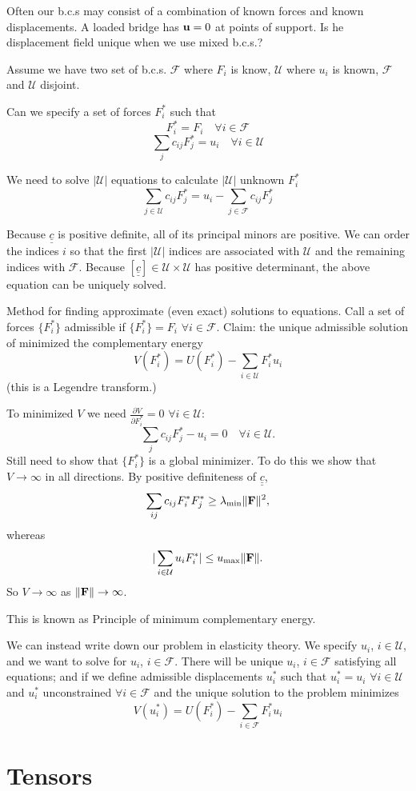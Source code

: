 \documentclass[12pt]{article}
\newcommand{\uu}{{\bf u}}
\newcommand{\FF}{{\bf F}}
\newcommand{\cc}{{\underline{\underline c}}}
\newcommand{\UU}{{\mathcal U}}
\newcommand{\cF}{{\mathcal F}}
\begin{document}
\bigskip
\bigskip
Often our b.c.s may consist of a combination of known forces and known displacements. A loaded bridge has $\uu=0$ at points of support. Is he displacement field unique when we use mixed b.c.s.?

Assume we have two set of b.c.s. $\cF$ where $F_i$ is know, $\UU$ where $u_i$ is known, $\cF$ and $\UU$ disjoint.

Can we specify a set of forces $F_i^*$ such that 
\[
F_i^*  = F_i \quad  \forall i\in \cF
\]
\[
\sum_jc_{ij}F_j^*  = u_i \quad \forall i\in \UU
\]

We need to solve $|\UU|$ equations to calculate $|\UU|$ unknown $F_i^*$
\[
\sum_{j\in \UU} c_{ij}F_j^* = u_i - \sum_{j\in\cF} c_{ij}F_j^*
\]

Because $\cc$ is positive definite, all of its principal minors are positive. We can order the indices $i$ so that the first $|\UU|$ indices are associated with $\UU$ and the remaining indices with $\cF$.
Because $[\cc]\in\UU\times\UU$ has positive determinant, the above equation can be uniquely solved.

Method for finding approximate (even exact) solutions to equations.
Call a set of forces $\{F_i^*\}$ admissible if $\{F_i^*\} = F_i$ $\forall i\in\cF$.
Claim: the unique admissible solution of minimized the complementary energy
\[
V(F_i^*) = U(F_i^*) - \sum_{i\in\UU} F_i^*u_i
\]
(this is a Legendre transform.)

To minimized $V$ we need $\frac{\partial V}{\partial F_i^*}=0$ $\forall i\in\UU$:
\[
\sum_jc_{ij}F_j^* - u_i=0 \quad \forall i\in\UU.
\]
Still need to show that $\{F_i^*\}$ is a global minimizer. To do this we show that $V\to \infty$ in all directions.
By positive definiteness of $\cc$, 
\[
\sum_{ij} c_{ij}  F_i^* F_j^* \geq \lambda_{\min}\|\FF\|^2,
\]
whereas
\[
|\sum_{i\in\UU}u_iF_i^*| \leq u_{\max} \|\FF\|.
\]
So $V\to\infty$ as $\|\FF\|\to\infty$.

This is known as Principle of minimum complementary energy.

We can instead write down our problem in elasticity theory. 
We specify $u_i$, $i\in\UU$, and we want to solve for  $u_i$, $i\in\cF$. There will be unique $u_i$, $i\in\cF$ satisfying all equations; and if we define admissible displacements $u_i^*$ such that  $u_i^* = u_i$ $\forall i\in\UU$ and $u_i^*$ unconstrained $\forall i\in\cF$ and the unique solution to the problem minimizes 
\[
V(u_i^*) = U(F_i^*) - \sum_{i\in\cF} F_i^*u_i
\]

\section{Tensors}
\end{document}
